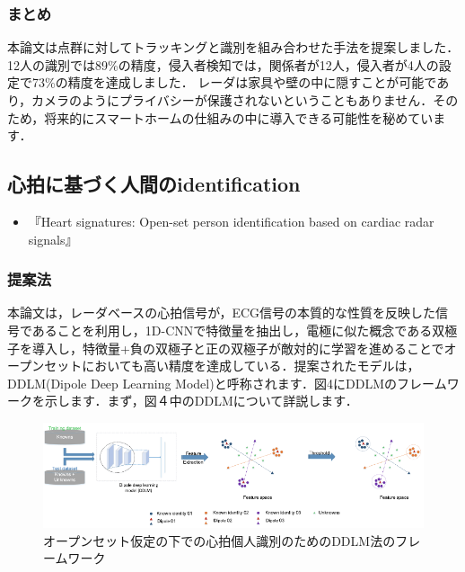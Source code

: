 \documentclass[dvipdfmx]{jsarticle}
\begin{document}
\subsubsection{まとめ}
本論文は点群に対してトラッキングと識別を組み合わせた手法を提案しました．12人の識別では89\%の精度，侵入者検知では，関係者が12人，侵入者が4人の設定で73\%の精度を達成しました．
レーダは家具や壁の中に隠すことが可能であり，カメラのようにプライバシーが保護されないということもありません．そのため，将来的にスマートホームの仕組みの中に導入できる可能性を秘めています．

\subsection{心拍に基づく人間のidentification}
\begin{itemize}
    \item 『Heart signatures: Open-set person identification based on cardiac radar signals\cite{DDLM}』
\end{itemize}

\subsubsection{提案法}

本論文は，レーダベースの心拍信号が，ECG信号の本質的な性質を反映した信号であることを利用し，1D-CNNで特徴量を抽出し，電極に似た概念である双極子を導入し，特徴量+負の双極子と正の双極子が敵対的に学習を進めることでオープンセットにおいても高い精度を達成している．提案されたモデルは，DDLM(Dipole Deep Learning Model)と呼称されます．図4にDDLMのフレームワークを示します．まず，図４中のDDLMについて詳説します．

\begin{figure}[H]
\begin{center}
\includegraphics[width=\linewidth]{./img/ddlm_framework.png}
\end{center}
\caption{オープンセット仮定の下での心拍個人識別のためのDDLM法のフレームワーク}
\end{figure}
\end{document}

